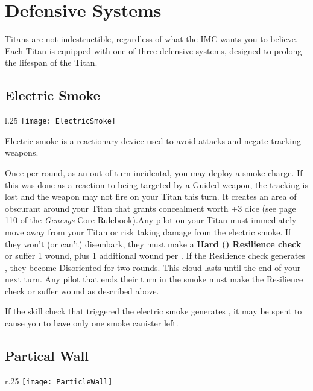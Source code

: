 \section{Defensive Systems}
Titans are not indestructible, regardless of what the IMC wants you to believe. Each Titan is equipped with one of three defensive systems, designed to prolong the lifespan of the Titan.


\subsection{Electric Smoke}
\begin{wrapfigure}[6]{l}{.25\linewidth}
\vspace*{-2em}
\texttt{[image: ElectricSmoke]}
\end{wrapfigure}

Electric smoke is a reactionary device used to avoid attacks and negate tracking weapons.

Once per round, as an out-of-turn incidental, you may deploy a smoke charge. If this was done as a reaction to being targeted by a Guided weapon, the tracking is lost and the weapon may not fire on your Titan this turn. It creates an area of obscurant around your Titan that grants concealment worth +3 dice (see page 110 of the \emph{Genesys} Core Rulebook).Any pilot on your Titan must immediately move away from your Titan or risk taking damage from the electric smoke. If they won't (or can't) disembark, they must make a \textbf{Hard (\DifficultyDie\DifficultyDie\DifficultyDie) Resilience check} or suffer 1 wound, plus 1 additional wound per \Failure. If the Resilience check generates \Threat\Threat, they become Disoriented for two rounds. This cloud lasts until the end of your next turn. Any pilot that ends their turn in the smoke must make the Resilience check or suffer wound as described above.

If the skill check that triggered the electric smoke generates \Advantage\Advantage, it may be spent to cause you to have only one smoke canister left.

\subsection{Partical Wall}
\begin{wrapfigure}[6]{r}{.25\linewidth}
\vspace*{-4em}
\texttt{[image: ParticleWall]}
\end{wrapfigure}

